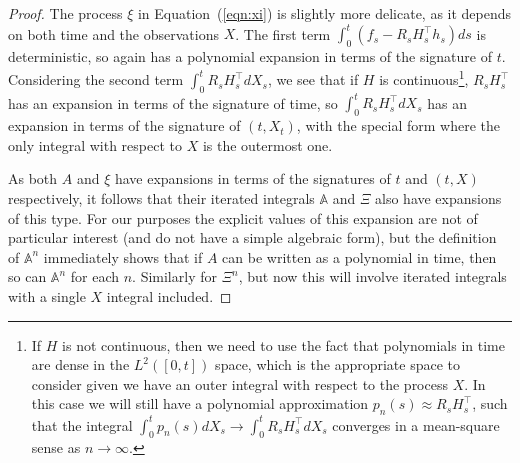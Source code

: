 \documentclass[10pt,a4paper]{amsart}
\theoremstyle{plain}
\theoremstyle{remark}
\begin{document}
\begin{proof}
The process $\xi$ in Equation~(\ref{eqn:xi}) is slightly more delicate, as it depends on both time and the observations $X$. The first term $\int_0^t (f_s - R_s H_s^\top h_s) ds$ is deterministic, so again has a polynomial expansion in terms of the signature of $t$. Considering the second term $\int_0^t R_sH_s^\top dX_s$, we see that if $H$ is continuous\footnote{If $H$ is not continuous, then we need to use the fact that polynomials in time are dense in the $L^2([0,t])$ space, which is the appropriate space to consider given we have an outer integral with respect to the process $X$. In this case we will still have a polynomial approximation $p_n(s) \approx R_sH_s^\top$, such that the integral $\int_0^t p_n(s) dX_s \to \int_0^t R_s H_s^\top dX_s$ converges in a mean-square sense as $n\to \infty$.}, $R_sH_s^\top$ has an expansion in terms of the signature of time, so $\int_0^t R_sH_s^\top dX_s$ has an expansion in terms of the signature of $(t,X_t)$, with the special form where the only integral with respect to $X$ is the outermost one.

As both $A$ and $\xi$ have expansions in terms of the signatures of $t$ and $(t,X)$ respectively, it follows that their iterated integrals $\mathbb{A}$ and $\Xi$ also have expansions of this type. For our purposes the explicit values of this expansion are not of particular interest (and do not have a simple algebraic form), but the definition of $\mathbb{A}^n$ immediately shows that if $A$ can be written as a polynomial in time, then so can $\mathbb{A}^n$ for each $n$. Similarly for $\Xi^n$, but now this will involve iterated integrals with a single $X$ integral included.

\end{proof}
\end{document}
